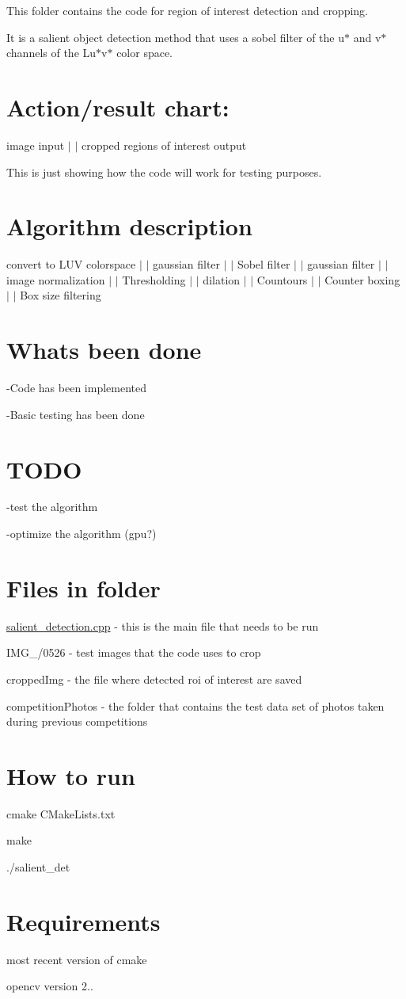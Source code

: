 This folder contains the code for region of interest detection and cropping.

It is a salient object detection method that uses a sobel filter of the u$\ast$ and v$\ast$ channels of the Lu$\ast$v$\ast$ color space.

\section*{Action/result chart\-: }

image input $\vert$ $\vert$ cropped regions of interest output

This is just showing how the code will work for testing purposes.

\section*{Algorithm description }

convert to L\-U\-V colorspace $\vert$ $\vert$ gaussian filter $\vert$ $\vert$ Sobel filter $\vert$ $\vert$ gaussian filter $\vert$ $\vert$ image normalization $\vert$ $\vert$ Thresholding $\vert$ $\vert$ dilation $\vert$ $\vert$ Countours $\vert$ $\vert$ Counter boxing $\vert$ $\vert$ Box size filtering

\section*{Whats been done }

-\/\-Code has been implemented

-\/\-Basic testing has been done

\section*{T\-O\-D\-O }

-\/test the algorithm

-\/optimize the algorithm (gpu?)

\section*{Files in folder }

\hyperlink{salient__detection_8cpp}{salient\-\_\-detection.\-cpp} -\/ this is the main file that needs to be run

I\-M\-G\-\_/0526 -\/ test images that the code uses to crop

cropped\-Img -\/ the file where detected roi of interest are saved

competition\-Photos -\/ the folder that contains the test data set of photos taken during previous competitions

\section*{How to run }

cmake C\-Make\-Lists.\-txt

make

./salient\-\_\-det

\section*{Requirements }

most recent version of cmake

opencv version 2.. 